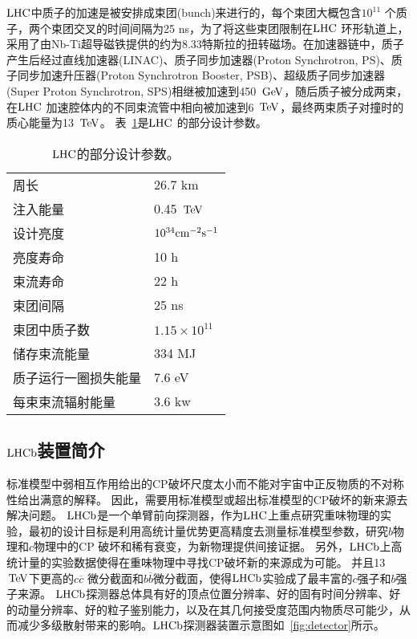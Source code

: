 $\mbox{LHC}$中质子的加速是被安排成束团(bunch)来进行的，每个束团大概包含$10^{11}$ 个质子，两个束团交叉的时间间隔为25 ns，为了将这些束团限制在$\mbox{LHC}$ 环形轨道上，采用了由Nb-Ti超导磁铁提供的约为8.33特斯拉的扭转磁场。在加速器链中，质子产生后经过直线加速器(LINAC)、质子同步加速器(Proton Synchrotron, PS)、质子同步加速升压器(Proton Synchrotron Booster, PSB)、超级质子同步加速器(Super Proton Synchrotron, SPS)相继被加速到450 $\mathrm{\,Ge\kern -0.1em V}$，随后质子被分成两束，在$\mbox{LHC}$ 加速腔体内的不同束流管中相向被加速到6 $\mathrm{\,Te\kern -0.1em V}$，最终两束质子对撞时的质心能量为13 $\mathrm{\,Te\kern -0.1em V}$。 表~\ref{tab:lhc}是$\mbox{LHC}$ 的部分设计参数。
\begin{table}
\centering
\caption{$\mbox{LHC}$的部分设计参数。}
\begin{tabular}{ll}
\toprule
周长                                 & 26.7 km\\
注入能量                             & 0.45 $\mathrm{\,Te\kern -0.1em V}$  \\
设计亮度                             & $10^{34} \rm{cm}^{-2}s^{-1}$ \\
亮度寿命                             & 10 h \\
束流寿命                             & 22 h \\
束团间隔                             & 25 ns\\
束团中质子数                         & $1.15\times10^{11}$ \\
储存束流能量                         & 334 MJ\\
质子运行一圈损失能量                 & 7.6 eV \\
每束束流辐射能量                     & 3.6 kw\\
\bottomrule
\end{tabular}
\label{tab:lhc}
\end{table}

\subsection{$\mbox{LHCb}$装置简介}

标准模型中弱相互作用给出的CP破坏尺度太小而不能对宇宙中正反物质的不对称性给出满意的解释。
因此，需要用标准模型或超出标准模型的CP破坏的新来源去解决问题。
$\mbox{LHCb}$是一个单臂前向探测器，作为$\mbox{LHC}$上重点研究重味物理的实验，最初的设计目标是利用高统计量优势更高精度去测量标准模型参数，研究$b$物理和$c$物理中的CP 破坏和稀有衰变，为新物理提供间接证据。
另外，$\mbox{LHCb}$上高统计量的实验数据使得在重味物理中寻找CP破坏新的来源成为可能。
并且13 $\mathrm{\,Te\kern -0.1em V}$下更高的$c\overline{c}$ 微分截面和$b\overline{b}$微分截面，使得$\mbox{LHCb}$实验成了最丰富的$c$强子和$b$强子来源。
$\mbox{LHCb}$探测器总体具有好的顶点位置分辨率、好的固有时间分辨率、好的动量分辨率、好的粒子鉴别能力，以及在其几何接受度范围内物质尽可能少，从而减少多级散射带来的影响。$\mbox{LHCb}$探测器装置示意图如~\ref{fig:detector}所示。

